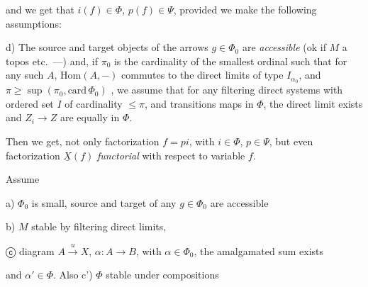 \documentclass[11pt,a4paper]{article}
\begin{document}


and we get that $i(f) \in \Phi$, $p(f) \in \Psi$, provided we make the
following assumptions:

d) The  source and target objects of the arrows
$g \in \Phi_0$ are \emph{accessible} (ok if $M$ a topos etc.\ —) and, if
$\pi_0$ is the cardinality of the smallest ordinal \ill{} such that for any
such $A$, $\mathrm{Hom}(A, -)$ commutes to the \struck{\ill{}} direct limits
of type $I_{\alpha_0}$,  and 
$\pi \geqslant \sup(\pi_0, \mathrm{card}\, \Phi_0)$ , we
assume that for any filtering direct systems with ordered set $I$ of
cardinality $\leqslant \pi$, and transitions maps in $\Phi$, the direct
limit exists and \struck{\ill{}} $Z_i \to Z$ are equally in $\Phi$.

Then we get, not only factorization $f = pi$, with $i \in \Phi$,
$p \in \Psi$, but even factorization $\underline{X}(f)$
\emph{functorial} with respect to variable $f$.

\emph{\ill{}} Assume \struck{\ill{}}

a) $\Phi_0$ is small, source and target of any $g \in \Phi_0$ are
accessible

b) $M$ stable by filtering direct limits, 
\struck{\ill{}}

ⓒ    diagram
$A \xrightarrow{u} X$, $\alpha : A \to B$, with $\alpha \in \Phi_0$, the
amalgamated sum exists


and $\alpha' \in \Phi$.
\qquad Also c') $\Phi$ stable under compositions
\end{document}
